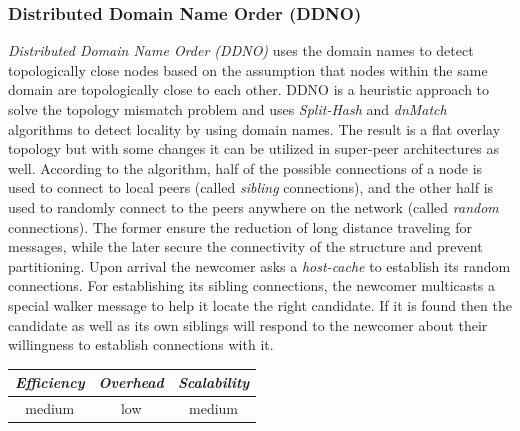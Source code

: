 \subsubsection{Distributed Domain Name Order (DDNO)}
\emph{Distributed Domain Name Order (DDNO)} \cite{Z-YK2005} uses the domain
names to detect topologically close nodes based on the assumption that nodes
within the same domain are topologically close to each other. DDNO is a
heuristic approach to solve the topology mismatch problem and uses
\emph{Split-Hash} and \emph{dnMatch} algorithms to detect locality by using
domain names. The result is a flat overlay topology but with some changes it
can be utilized in super-peer architectures as well. According to the algorithm,
half of the possible connections of a node is used to connect to local peers
(called \emph{sibling} connections), and the other half is used to randomly
connect to the peers anywhere on the network (called \emph{random} connections).
The former ensure the reduction of long distance traveling for messages, while
the later secure the connectivity of the structure and prevent partitioning.
Upon arrival the newcomer asks a \emph{host-cache} to establish its
random connections. For establishing its sibling connections, the newcomer
multicasts a special walker message to help it locate the right
candidate. If it is found then the candidate as well as its own siblings will
respond to the newcomer about their willingness to establish connections with
it.

\begin{center}
\begin{tabular}{ccc}
\emph{Efficiency} & \emph{Overhead} & \emph{Scalability} \\
\hline
medium &
low &
medium
\end{tabular}
\end{center}

